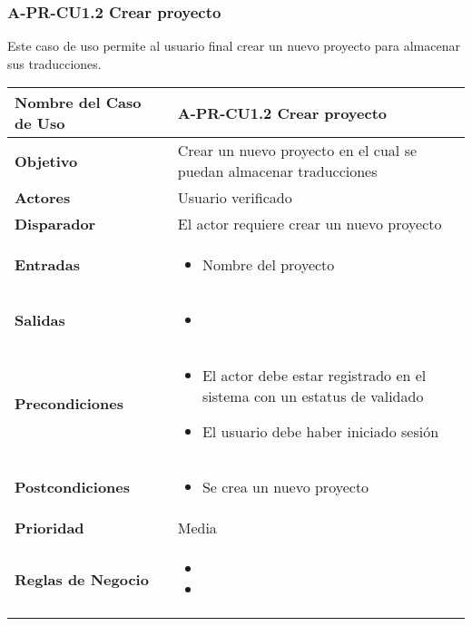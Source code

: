 \subsubsection{A-PR-CU1.2 Crear proyecto}
Este caso de uso permite al usuario final crear un nuevo proyecto para almacenar sus traducciones.

\begin{longtable}{|J{5cm}|J{10.3cm}|}
	\hline
	\textbf{Nombre del Caso de Uso} &
		A-PR-CU1.2 Crear proyecto \\ \hline
	\textbf{Objetivo} &
		Crear un nuevo proyecto en el cual se puedan almacenar traducciones \\ \hline
	\textbf{Actores} &
		Usuario verificado \\ \hline 
	\textbf{Disparador} & 
		El actor requiere crear un nuevo proyecto \\ \hline 
	\textbf{Entradas} & 
		\begin{itemize}
				\item Nombre del proyecto
		\end{itemize}\\ \hline 
	\textbf{Salidas} & 
		\begin{itemize}
			\item \textbf{}
		\end{itemize} \\ \hline
	\textbf{Precondiciones} &
		\begin{itemize}
		    \item El actor debe estar registrado en el sistema con un estatus de validado
		    \item El usuario debe haber iniciado sesión
		\end{itemize} \\ \hline
	\textbf{Postcondiciones} &
			\begin{itemize}
			    \item Se crea un nuevo proyecto
			\end{itemize} \\ \hline
	\textbf{Prioridad} & 
		Media \\ \hline
	\textbf{Reglas de Negocio} & 
		\begin{itemize}
			\item %
			\item %
		\end{itemize} \\ \hline

\end{longtable}

